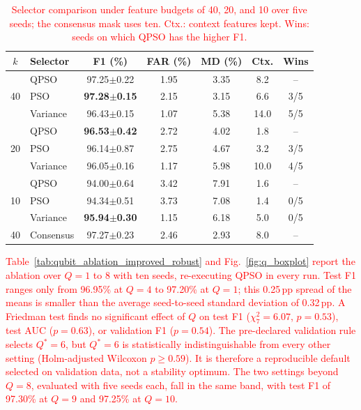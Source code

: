 \documentclass[conference]{IEEEtran}
\begin{document}
\begin{table}[!t]
\centering
\scriptsize
\caption{\textcolor{red}{Selector comparison under feature budgets of 40, 20, and 10 over five seeds; the consensus mask uses ten. Ctx.: context features kept. Wins: seeds on which QPSO has the higher F1.}}
\label{tab:kbudget}
\color{red}
\setlength{\tabcolsep}{3pt}
\begin{tabular}{clccccc}
\hline\toprule
$k$ & Selector & F1 (\%) & FAR (\%) & MD (\%) & Ctx. & Wins \\
\hline\toprule
\multirow{3}{*}{40} & QPSO & 97.25$\pm$0.22 & 1.95 & 3.35 & 8.2 & -- \\
 & PSO & \textbf{97.28$\pm$0.15} & 2.15 & 3.15 & 6.6 & 3/5 \\
 & Variance & 96.43$\pm$0.15 & 1.07 & 5.38 & 14.0 & 5/5 \\
\midrule
\multirow{3}{*}{20} & QPSO & \textbf{96.53$\pm$0.42} & 2.72 & 4.02 & 1.8 & -- \\
 & PSO & 96.14$\pm$0.87 & 2.75 & 4.67 & 3.2 & 3/5 \\
 & Variance & 96.05$\pm$0.16 & 1.17 & 5.98 & 10.0 & 4/5 \\
\midrule
\multirow{3}{*}{10} & QPSO & 94.00$\pm$0.64 & 3.42 & 7.91 & 1.6 & -- \\
 & PSO & 94.34$\pm$0.51 & 3.73 & 7.08 & 1.4 & 0/5 \\
 & Variance & \textbf{95.94$\pm$0.30} & 1.15 & 6.18 & 5.0 & 0/5 \\
\midrule
40 & Consensus & 97.27$\pm$0.23 & 2.46 & 2.93 & 8.0 & -- \\
\hline\toprule
\end{tabular}
\end{table}






\textcolor{red}{Table~\ref{tab:qubit_ablation_improved_robust}
and Fig.~\ref{fig:q_boxplot} report the ablation over $Q=1$ to 8 with
ten seeds, re-executing QPSO in every run. Test F1 ranges only from
96.95\% at $Q=4$ to 97.20\% at $Q=1$; this 0.25\,pp spread of the
means is smaller than the average seed-to-seed standard deviation of
0.32\,pp. A Friedman test finds no significant effect of $Q$ on test
F1 ($\chi^2_7=6.07$, $p=0.53$), test AUC ($p=0.63$), or validation F1
($p=0.54$). The pre-declared validation rule selects $Q^{*}=6$, but
$Q^{*}=6$ is statistically indistinguishable from every other setting
(Holm-adjusted Wilcoxon $p\ge0.59$). It is therefore a reproducible
default selected on validation data, not a stability optimum. The two
settings beyond $Q=8$, evaluated with five seeds each, fall in the same band,
with test F1 of 97.30\% at $Q=9$ and 97.25\% at $Q=10$.}
\end{document}
